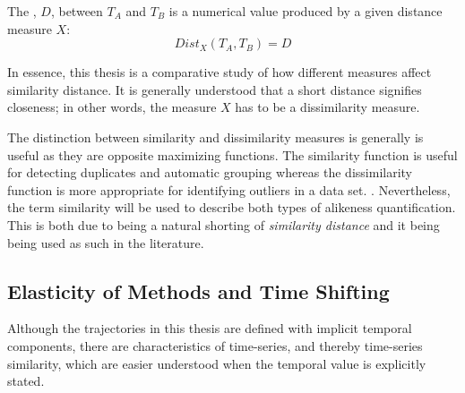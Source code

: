 
\medskip
\begin{definition} %
\label{def:sim}
The , $D$, between $T_A$ and  $T_B$ is a numerical value produced by a given distance measure $X$:
\begin{equation*}
Dist_X(T_A, T_B) = D
\end{equation*}
\end{definition}

In essence, this thesis is a comparative study of how different measures affect similarity distance. 
It is generally understood that a short distance signifies closeness; in other words, the measure $X$ has to be a dissimilarity measure. 

The distinction between similarity and dissimilarity measures is generally is useful as they are opposite maximizing functions. 
The similarity function is useful for detecting duplicates and automatic grouping whereas the dissimilarity function is more appropriate for identifying outliers in a data set. \cite{20-SimilarityDissimilarity}. 
Nevertheless, the term similarity will be used to describe both types of alikeness quantification. 
This is both due to being a natural shorting of \textit{similarity distance}  and it being being used as such in the literature\cite{9-FastDTWAccurate, 19-ClusterAnalysis,23-DiscoveringSimilar,43-TrajectoryDistance}. 





\subsection{Elasticity of Methods and Time Shifting}\label{sec:elasticity}
 Although the trajectories in this thesis are defined with implicit temporal components, there are characteristics of time-series, and thereby time-series similarity, which are easier understood when the temporal value is explicitly stated.
 
